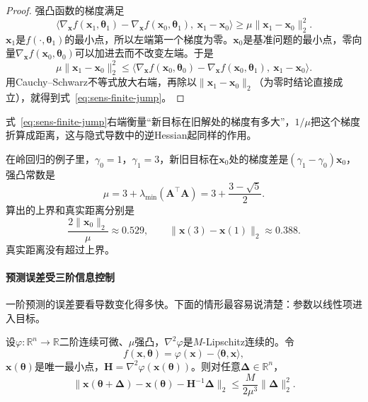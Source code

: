 \begin{proof}
强凸函数的梯度满足
\[
 \bigl\langle\nabla_{\bm{x}}f(\bm{x}_1,\bm{\theta}_1)-\nabla_{\bm{x}}f(\bm{x}_0,\bm{\theta}_1),\ \bm{x}_1-\bm{x}_0\bigr\rangle\geq\mu\lVert\bm{x}_1-\bm{x}_0\rVert_2^2.
\]
$\bm{x}_1$是$f(\cdot,\bm{\theta}_1)$的最小点，所以左端第一个梯度为零。$\bm{x}_0$是基准问题的最小点，零向量$\nabla_{\bm{x}}f(\bm{x}_0,\bm{\theta}_0)$可以加进去而不改变左端。于是
\[
 \mu\lVert\bm{x}_1-\bm{x}_0\rVert_2^2\leq\bigl\langle\nabla_{\bm{x}}f(\bm{x}_0,\bm{\theta}_0)-\nabla_{\bm{x}}f(\bm{x}_0,\bm{\theta}_1),\ \bm{x}_1-\bm{x}_0\bigr\rangle.
\]
用Cauchy--Schwarz不等式放大右端，再除以$\lVert\bm{x}_1-\bm{x}_0\rVert_2$（为零时结论直接成立），就得到式~\eqref{eq:sens-finite-jump}。
\end{proof}

式~\eqref{eq:sens-finite-jump}右端衡量“新目标在旧解处的梯度有多大”，$1/\mu$把这个梯度折算成距离，这与隐式导数中的逆Hessian起同样的作用。

在岭回归的例子里，$\gamma_0=1$，$\gamma_1=3$，新旧目标在$\bm{x}_0$处的梯度差是$(\gamma_1-\gamma_0)\bm{x}_0$，强凸常数是
\[
 \mu=3+\lambda_{\min}(\bm{A}^{\top}\bm{A})=3+\frac{3-\sqrt{5}}{2}.
\]
算出的上界和真实距离分别是
\[
 \frac{2\lVert\bm{x}_0\rVert_2}{\mu}\approx0.529,\qquad
 \lVert\bm{x}(3)-\bm{x}(1)\rVert_2\approx0.388.
\]
真实距离没有超过上界。

\paragraph{预测误差受三阶信息控制}
一阶预测的误差要看导数变化得多快。下面的情形最容易说清楚：参数以线性项进入目标。

\begin{theorem}[线性扰动下的预测误差]
\label{thm:sens-prediction-error}
设$\varphi:\mathbb{R}^n\to\mathbb{R}$二阶连续可微、$\mu$强凸，$\nabla^2\varphi$是$M$-Lipschitz连续的。令
\begin{equation}
 f(\bm{x},\bm{\theta})=\varphi(\bm{x})-\langle\bm{\theta},\bm{x}\rangle,
 \label{eq:sens-linear-perturbation}
\end{equation}
$\bm{x}(\bm{\theta})$是唯一最小点，$\bm{H}=\nabla^2\varphi(\bm{x}(\bm{\theta}))$。则对任意$\bm{\Delta}\in\mathbb{R}^n$，
\begin{equation}
 \bigl\lVert\bm{x}(\bm{\theta}+\bm{\Delta})-\bm{x}(\bm{\theta})-\bm{H}^{-1}\bm{\Delta}\bigr\rVert_2\leq\frac{M}{2\mu^3}\lVert\bm{\Delta}\rVert_2^2.
 \label{eq:sens-prediction-error}
\end{equation}
\end{theorem}

